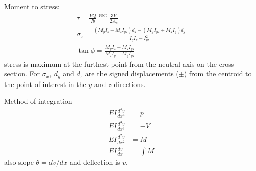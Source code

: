 Moment to stress:
\begin{gather*}
    \tau = \frac{VQ}{Ib} \overset{\text{rect}}{=} \frac{3V}{2A_c} \\
    \sigma_{x} = \frac{(M_y I_z + M_z I_{yz})d_{z} - (M_y I_{yz} + M_z I_y)d_{y}}{I_y I_z - I_{yz}^2} \\
    \tan{\phi} = \frac{M_y I_z + M_z I_{yz}}{M_z I_y + M_y I_{yz}} 
\end{gather*}
stress is maximum at the furthest point from the neutral axis on the cross-section. For $\sigma_x$, 
$d_y$ and $d_z$ are the signed displacements ($\pm$) from the centroid to the point of interest in the $y$ and $z$ directions.

Method of integration
\begin{align*}
    EI \frac{d^4 v}{dx^4} &= p \\
    EI \frac{d^3 v}{dx^3} &= -V \\ 
    EI \frac{d^2 v}{dx^2} &= M \\
    EI \frac{dv}{dx} &= \int M 
\end{align*}
also slope $\theta = dv/dx$ and deflection is $v$.

